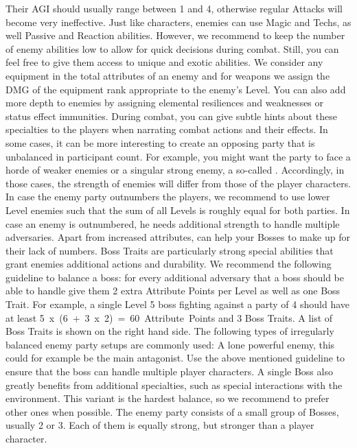 Their AGI should usually range between 1 and 4, otherwise regular Attacks will become very ineffective.
Just like characters, enemies can use Magic and Techs, as well Passive and Reaction abilities.
However, we recommend to keep the number of enemy abilities low to allow for quick decisions during combat.
Still, you can feel free to give them access to unique and exotic abilities.
We consider any equipment in the total attributes of an enemy and for weapons we assign the DMG of the equipment rank appropriate to the enemy's Level.
You can also add more depth to enemies by assigning elemental resiliences and weaknesses or status effect immunities.
During combat, you can give subtle hints about these specialties to the players when narrating combat actions and their effects.
%
\vfill
%
In some cases, it can be more interesting to create an opposing party that is unbalanced in participant count.
For example, you might want the party to face a horde of weaker enemies or a singular strong enemy, a so-called .
Accordingly, in those cases, the strength of enemies will differ from those of the player characters.
In case the enemy party outnumbers the players, we recommend to use lower Level enemies such that the sum of all Levels is roughly equal for both parties.
In case an enemy is outnumbered, he needs additional strength to handle multiple adversaries.
Apart from increased attributes,  can help your Bosses to make up for their lack of numbers.
Boss Traits are particularly strong special abilities that grant enemies additional actions and durability. 
We recommend the following guideline to balance a boss: for every additional adversary that a boss should be able to handle give them 2 extra Attribute Points per Level as well as one Boss Trait.
For example, a single Level 5 boss fighting against a party of 4 should have at least \mbox{5 x (6 + 3 x 2) = 60 Attribute Points} and 3 Boss Traits.
A list of Boss Traits is shown on the right hand side.
%
\vfill
%
The following types of irregularly balanced enemy party setups are commonly used:
\ofrow
{}
A lone powerful enemy, this could for example be the main antagonist.
Use the above mentioned guideline to ensure that the boss can handle multiple player characters.
A single Boss also greatly benefits from additional specialties, such as special interactions with the environment.
This variant is the hardest balance, so we recommend to prefer other ones when possible.
\ofrow
{} 
The enemy party consists of a small group of Bosses, usually 2 or 3.
Each of them is equally strong, but stronger than a player character.
